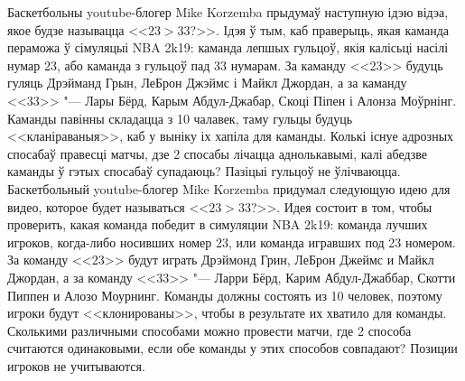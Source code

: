 \documentclass[11pt]{article}
\begin{document}
\begin{problemList}
\medskip

\problemItemSimple
{Баскетбольны youtube-блогер Mike Korzemba прыдумаў наступную ідэю відэа, якое будзе называцца <<$23 > 33$?>>.
Ідэя ў тым, каб праверыць, якая каманда пераможа ў сімуляцыі NBA 2k19: каманда лепшых гульцоў, якія калісьці насілі нумар 23, або каманда з гульцоў пад 33 нумарам.
За каманду <<23>> будуць гуляць Дрэйманд Грын, ЛеБрон Джэймс і Майкл Джордан,
а за каманду <<33>> "--- Лары Бёрд, Карым Абдул-Джабар, Скоці Піпен і Алонза Моўрнінг.
Каманды павінны складацца з 10 чалавек, таму гульцы будуць <<кланіраваныя>>, каб у выніку іх хапіла для каманды.
Колькі існуе адрозных спосабаў правесці матчы, дзе 2 спосабы лічацца аднолькавымі,
калі абедзве каманды ў гэтых спосабаў супадаюць? Пазіцыі гульцоў не ўлічваюцца.}
{Баскетбольный youtube-блогер Mike Korzemba придумал следующую идею для видео, которое будет называться <<$23 > 33$?>>.
Идея состоит в том, чтобы проверить, какая команда победит в симуляции NBA 2k19: команда лучших игроков, когда-либо носивших номер 23, или команда игравших под 23 номером.
За команду <<23>> будут играть Дрэймонд Грин, ЛеБрон Джеймс и Майкл Джордан,
а за команду <<33>> "--- Ларри Бёрд, Карим Абдул-Джаббар, Скотти Пиппен и Алозо Моурнинг.
Команды должны состоять из 10 человек, поэтому игроки будут <<клонированы>>, чтобы в результате их хватило для команды.
Сколькими различными способами можно провести матчи, где 2 способа считаются одинаковыми,
если обе команды у этих способов совпадают? Позиции игроков не учитываются.}

\end{problemList}
\end{document}

